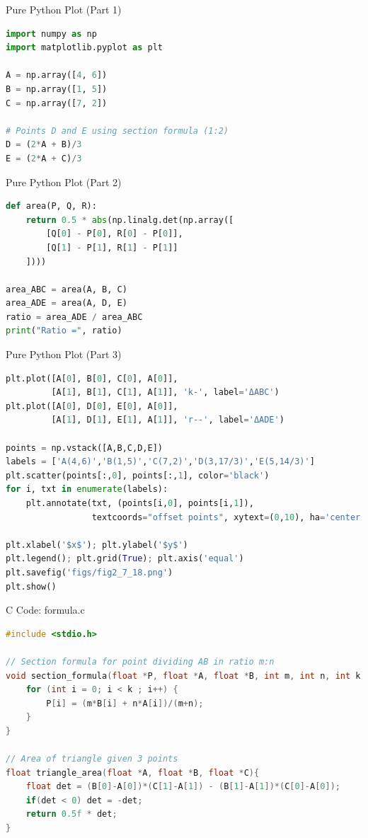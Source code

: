\documentclass{beamer}
\begin{document}
\begin{frame}[fragile]{Pure Python Plot (Part 1)}
\begin{lstlisting}[language=Python]
import numpy as np
import matplotlib.pyplot as plt

A = np.array([4, 6])
B = np.array([1, 5])
C = np.array([7, 2])

# Points D and E using section formula (1:2)
D = (2*A + B)/3
E = (2*A + C)/3
\end{lstlisting}
\end{frame}

\begin{frame}[fragile]{Pure Python Plot (Part 2)}
\begin{lstlisting}[language=Python]
def area(P, Q, R):
    return 0.5 * abs(np.linalg.det(np.array([
        [Q[0] - P[0], R[0] - P[0]],
        [Q[1] - P[1], R[1] - P[1]]
    ])))

area_ABC = area(A, B, C)
area_ADE = area(A, D, E)
ratio = area_ADE / area_ABC
print("Ratio =", ratio)
\end{lstlisting}
\end{frame}

\begin{frame}[fragile]{Pure Python Plot (Part 3)}
\begin{lstlisting}[language=Python]
plt.plot([A[0], B[0], C[0], A[0]],
         [A[1], B[1], C[1], A[1]], 'k-', label='ΔABC')
plt.plot([A[0], D[0], E[0], A[0]],
         [A[1], D[1], E[1], A[1]], 'r--', label='ΔADE')

points = np.vstack([A,B,C,D,E])
labels = ['A(4,6)','B(1,5)','C(7,2)','D(3,17/3)','E(5,14/3)']
plt.scatter(points[:,0], points[:,1], color='black')
for i, txt in enumerate(labels):
    plt.annotate(txt, (points[i,0], points[i,1]),
                 textcoords="offset points", xytext=(0,10), ha='center')

plt.xlabel('$x$'); plt.ylabel('$y$')
plt.legend(); plt.grid(True); plt.axis('equal')
plt.savefig('figs/fig2_7_18.png')
plt.show()
\end{lstlisting}
\end{frame}

\begin{frame}[fragile]{C Code: formula.c}
\begin{lstlisting}[language=C]
#include <stdio.h>

// Section formula for point dividing AB in ratio m:n
void section_formula(float *P, float *A, float *B, int m, int n, int k){
    for (int i = 0; i < k ; i++) {
        P[i] = (m*B[i] + n*A[i])/(m+n);
    }
}

// Area of triangle given 3 points
float triangle_area(float *A, float *B, float *C){
    float det = (B[0]-A[0])*(C[1]-A[1]) - (B[1]-A[1])*(C[0]-A[0]);
    if(det < 0) det = -det;
    return 0.5f * det;
}
\end{lstlisting}
\end{frame}
\end{document}
